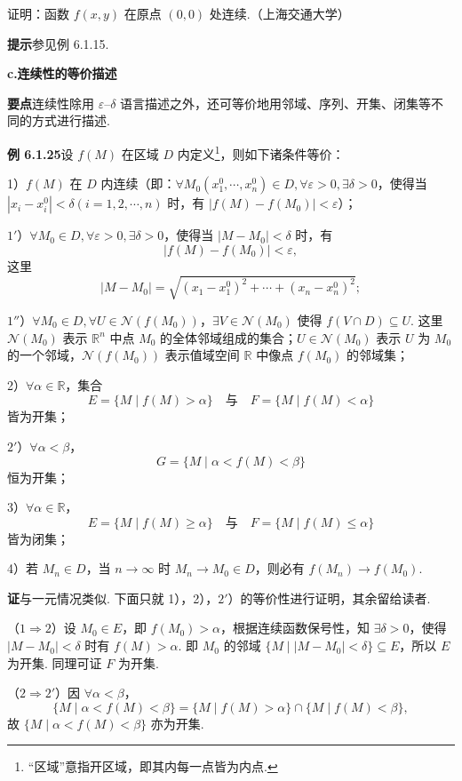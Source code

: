 \documentclass[UTF8,12pt,a4paper,fontset=fandol]{ctexart}
\begin{document}
证明：函数 $f(x,y)$ 在原点 $(0,0)$ 处连续.（上海交通大学）

\noindent\textbf{提示}\quad 参见例 6.1.15.

\noindent\textbf{c.\quad 连续性的等价描述}

\noindent\textbf{要点}\quad 连续性除用 $\varepsilon$--$\delta$ 语言描述之外，还可等价地用邻域、序列、开集、闭集等不同的方式进行描述.

\noindent\textbf{例 6.1.25}\quad 设 $f(M)$ 在区域 $D$ 内定义\footnote{“区域”意指开区域，即其内每一点皆为内点.}，则如下诸条件等价：

1）$f(M)$ 在 $D$ 内连续（即：$\forall M_0(x_1^0,\cdots,x_n^0)\in D,\forall\varepsilon>0,\exists\delta>0$，使得当 $|x_i-x_i^0|<\delta(i=1,2,\cdots,n)$ 时，有 $|f(M)-f(M_0)|<\varepsilon$）；

$1'$）$\forall M_0\in D,\forall\varepsilon>0,\exists\delta>0$，使得当 $|M-M_0|<\delta$ 时，有
\[
  |f(M)-f(M_0)|<\varepsilon,
\]
这里
\[
  |M-M_0|=\sqrt{(x_1-x_1^0)^2+\cdots+(x_n-x_n^0)^2};
\]

$1''$）$\forall M_0\in D,\forall U\in\mathcal{N}(f(M_0))$，$\exists V\in\mathcal{N}(M_0)$ 使得 $f(V\cap D)\subseteq U$. 这里 $\mathcal{N}(M_0)$ 表示 $\mathbb{R}^n$ 中点 $M_0$ 的全体邻域组成的集合；$U\in\mathcal{N}(M_0)$ 表示 $U$ 为 $M_0$ 的一个邻域，$\mathcal{N}(f(M_0))$ 表示值域空间 $\mathbb{R}$ 中像点 $f(M_0)$ 的邻域集；

2）$\forall\alpha\in\mathbb{R}$，集合
\[
  E=\{M\mid f(M)>\alpha\}\quad\text{与}\quad
  F=\{M\mid f(M)<\alpha\}
\]
皆为开集；

$2'$）$\forall\alpha<\beta$，
\[
  G=\{M\mid \alpha<f(M)<\beta\}
\]
恒为开集；

3）$\forall\alpha\in\mathbb{R}$，
\[
  E=\{M\mid f(M)\ge\alpha\}\quad\text{与}\quad
  F=\{M\mid f(M)\le\alpha\}
\]
皆为闭集；

4）若 $M_n\in D$，当 $n\to\infty$ 时 $M_n\to M_0\in D$，则必有 $f(M_n)\to f(M_0)$.

\noindent\textbf{证}\quad 与一元情况类似. 下面只就 1），2），$2'$）的等价性进行证明，其余留给读者.

（$1\Rightarrow2$）设 $M_0\in E$，即 $f(M_0)>\alpha$，根据连续函数保号性，知 $\exists\delta>0$，使得 $|M-M_0|<\delta$ 时有 $f(M)>\alpha$. 即 $M_0$ 的邻域 $\{M\mid |M-M_0|<\delta\}\subseteq E$，所以 $E$ 为开集. 同理可证 $F$ 为开集.

（$2\Rightarrow2'$）因 $\forall\alpha<\beta$，
\[
  \{M\mid \alpha<f(M)<\beta\}
  =\{M\mid f(M)>\alpha\}\cap\{M\mid f(M)<\beta\},
\]
故 $\{M\mid \alpha<f(M)<\beta\}$ 亦为开集.
\end{document}
